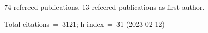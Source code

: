 74 refereed publications. 13 refeered publications as first author.

Total citations~=~3121; h-index~=~31 (2023-02-12)